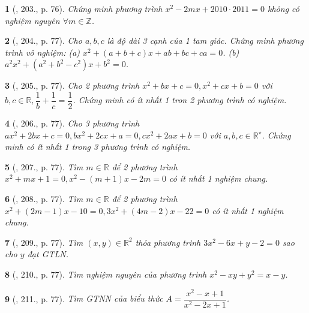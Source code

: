 \documentclass{article}
\newtheorem{baitoan}{}
\begin{document}
\begin{baitoan}[\cite{Tuyen_Toan_9_old}, 203., p. 76]
	Chứng minh phương trình $x^2 - 2mx + 2010\cdot2011 = 0$ không có nghiệm nguyên $\forall m\in\mathbb{Z}$.
\end{baitoan}

\begin{baitoan}[\cite{Tuyen_Toan_9_old}, 204., p. 77]
	Cho $a,b,c$ là độ dài 3 cạnh của 1 tam giác. Chứng minh phương trình vô nghiệm: (a) $x^2 + (a + b + c)x + ab + bc + ca = 0$. (b) $a^2x^2 + (a^2 + b^2 - c^2)x + b^2 = 0$.
\end{baitoan}

\begin{baitoan}[\cite{Tuyen_Toan_9_old}, 205., p. 77]
	Cho 2 phương trình $x^2 + bx + c = 0,x^2 + cx + b = 0$ với $b,c\in\mathbb{R},\dfrac{1}{b} + \dfrac{1}{c} = \dfrac{1}{2}$. Chứng minh có ít nhất 1 tron 2 phương trình có nghiệm.
\end{baitoan}

\begin{baitoan}[\cite{Tuyen_Toan_9_old}, 206., p. 77]
	Cho 3 phương trình $ax^2 + 2bx + c = 0,bx^2 + 2cx + a = 0,cx^2 + 2ax + b = 0$ với $a,b,c\in\mathbb{R}^\star$. Chứng minh có ít nhất 1 trong 3 phương trình có nghiệm.
\end{baitoan}

\begin{baitoan}[\cite{Tuyen_Toan_9_old}, 207., p. 77]
	Tìm $m\in\mathbb{R}$ để 2 phương trình $x^2 + mx + 1 = 0,x^2 - (m + 1)x - 2m = 0$ có ít nhất 1 nghiệm chung.
\end{baitoan}

\begin{baitoan}[\cite{Tuyen_Toan_9_old}, 208., p. 77]
	Tìm $m\in\mathbb{R}$ để 2 phương trình $x^2 + (2m - 1)x - 10 = 0,3x^2 + (4m - 2)x - 22 = 0$ có ít nhất 1 nghiệm chung.
\end{baitoan}

\begin{baitoan}[\cite{Tuyen_Toan_9_old}, 209., p. 77]
	Tìm $(x,y)\in\mathbb{R}^2$ thỏa phương trình $3x^2 - 6x + y - 2 = 0$ sao cho $y$ đạt {\rm GTLN}.
\end{baitoan}

\begin{baitoan}[\cite{Tuyen_Toan_9_old}, 210., p. 77]
	Tìm nghiệm nguyên của phương trình $x^2 - xy + y^2 = x - y$.
\end{baitoan}

\begin{baitoan}[\cite{Tuyen_Toan_9_old}, 211., p. 77]
	Tìm {\rm GTNN} của biểu thức $A = \dfrac{x^2 - x + 1}{x^2 - 2x + 1}$.
\end{baitoan}
\end{document}
